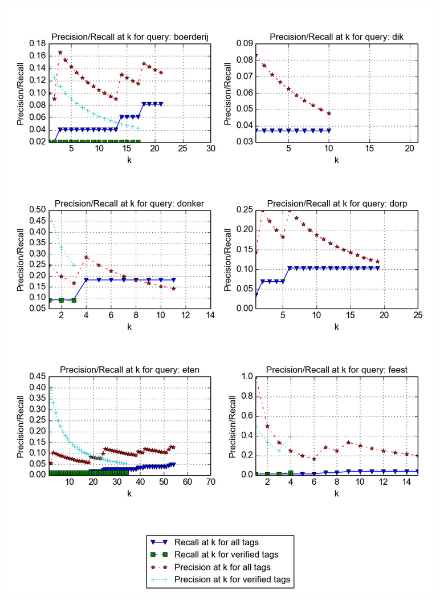 \begin{figure}[H]
\centering
\includegraphics[width=\textwidth]{appendixd/queries-boerderij}
\end{figure}


